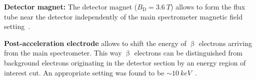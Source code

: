 {\par \textbf{Detector magnet:} The detector magnet ($B_\mathrm{D}=\SI{3.6}{T}$) allows to form the flux tube near the detector independently of the main spectrometer magnetic field setting~\cite{Amsbaugh2015}.}

{\par \textbf{Post-acceleration electrode} allows to shift the energy of $\upbeta$ electrons arriving from the main spectrometer. This way $\upbeta$ electrons can be distinguished from background electrons originating in the detector section by an energy region of interest cut. An appropriate setting was found to be $\sim\SI{10}{keV}$~\cite{Amsbaugh2015}.}